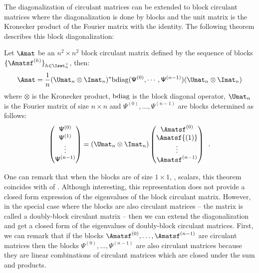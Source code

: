 \noindent
The diagonalization of circulant matrices can be extended to block circulant matrices where the diagonalization is done by blocks and the unit matrix is the Kronecker product of the Fourier matrix with the identity.
The following theorem describes this block diagonalization:
\begin{theorem}
  Let $\Amat$ be an $n^2 \times n^2$ block circulant matrix defined by the sequence of blocks $\{\Amatsf^{(h)}\}_{h \in \Iset^+_n}$, then:
  \begin{equation} \label{equation:ch2-block_diagonalization_block_circulant}
    \Amat = \frac{1}{n} (\Umat_n \otimes \Imat_n)^* \bdiag(\mathsf{\Psi}^{(0)}, \cdots, \mathsf{\Psi}^{(n-1)}) (\Umat_n \otimes \Imat_n)
  \end{equation}
  where $\otimes$ is the Kronecker product, $\mathrm{bdiag}$ is the block diagonal operator, $\Umat_n$ is the Fourier matrix of size $n \times n$ and $\mathsf{\Psi}^{(0)}, \dots, \mathsf{\Psi}^{(n-1)}$ are blocks determined as follows:
  \begin{equation}
    \leftmatrix
      \mathsf{\Psi}^{(0)} \\
      \mathsf{\Psi}^{(1)} \\
      \vdots \\
      \mathsf{\Psi}^{(n-1)} \\
    \rightmatrix = 
    (\Umat_n \otimes \Imat_n)
    \leftmatrix
      \Amatsf^{(0)} \\
      \Amatsf{(1)} \\
      \vdots \\
      \Amatsf^{(n-1)} \\
    \rightmatrix \enspace.
  \end{equation}
  \removespace
\end{theorem}
\noindent
One can remark that when the blocks are of size $1 \times 1$, \ie, scalars, this theorem coincides with  of .
Although interesting, this representation does not provide a closed form expression of the eigenvalues of the block circulant matrix.
However, in the special case where the blocks are also circulant matrices -- the matrix is called a doubly-block circulant matrix -- then we can extend the diagonalization and get a closed form of the eigenvalues of doubly-block circulant matrices.
First, we can remark that if the blocks $\Amatsf^{(0)}, \dots, \Amatsf^{(n-1)}$ are circulant matrices then the blocks $\mathsf{\Psi}^{(0)}, \dots, \mathsf{\Psi}^{(n-1)}$ are also circulant matrices because they are linear combinations of circulant matrices which are closed under the sum and products.
